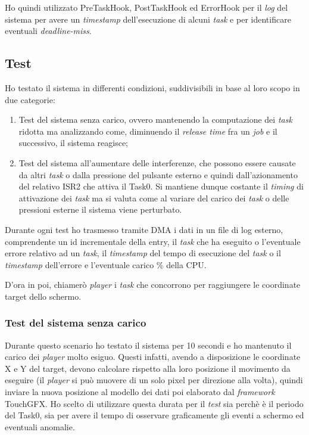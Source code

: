 \documentclass{article}
\begin{document}
Ho quindi utilizzato PreTaskHook, PostTaskHook ed ErrorHook per il \textit{log} del sistema per avere un \textit{\textit{timestamp}} dell'esecuzione di alcuni \textit{task} e per identificare eventuali \textit{deadline-miss}.

\subsection{Test}
Ho testato il sistema in differenti condizioni, suddivisibili in base al loro scopo in due categorie:
\begin{enumerate}
	\item Test del sistema senza carico, ovvero mantenendo la computazione dei \textit{task} ridotta ma analizzando come, diminuendo il \textit{release time} fra un \textit{job} e il successivo, il sistema reagisce;
	\item Test del sistema all'aumentare delle interferenze, che possono essere causate da altri \textit{task} o dalla pressione del pulsante esterno e quindi dall'azionamento del relativo ISR2 che attiva il Task0. Si mantiene dunque costante il \textit{timing} di attivazione dei \textit{task} ma si valuta come al variare del carico dei \textit{task} o delle pressioni esterne il sistema viene perturbato.
\end{enumerate}
Durante ogni test ho trasmesso tramite DMA i dati in un file di log esterno, comprendente un id incrementale della entry, il \textit{task} che ha eseguito o l'eventuale errore relativo ad un \textit{task}, il \textit{timestamp} del tempo di esecuzione del \textit{task} o il \textit{timestamp} dell'errore e l'eventuale carico \% della CPU.

D'ora in poi, chiamerò \textit{player} i \textit{task} che concorrono per raggiungere le coordinate target dello schermo.
\subsubsection{Test del sistema senza carico}
Durante questo scenario ho testato il sistema per 10 secondi e ho mantenuto il carico dei \textit{player} molto esiguo. Questi infatti, avendo a disposizione le coordinate X e Y del target, devono calcolare rispetto alla loro posizione il movimento da eseguire (il \textit{player} si può muovere di un solo pixel per direzione alla volta), quindi inviare la nuova posizione al modello dei dati poi elaborato dal \textit{framework} TouchGFX.
Ho scelto di utilizzare questa durata per il \textit{test} sia perchè è il periodo del Task0, sia per avere il tempo di osservare graficamente gli eventi a schermo ed eventuali anomalie.
\end{document}
